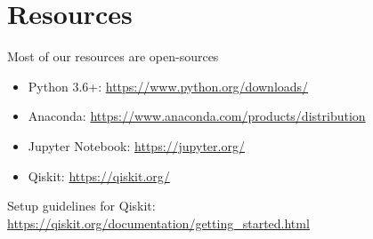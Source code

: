 \section{Resources}

Most of our resources are open-sources

\begin{itemize}
    \item Python 3.6+: \url{https://www.python.org/downloads/}
    \item Anaconda: \url{https://www.anaconda.com/products/distribution}
    \item Jupyter Notebook: \url{https://jupyter.org/}
    \item Qiskit: \url{https://qiskit.org/}
\end{itemize}

Setup guidelines for Qiskit: 
\url{https://qiskit.org/documentation/getting_started.html}